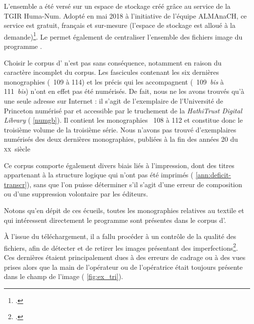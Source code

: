 L'ensemble a été versé sur un espace de stockage créé grâce au service \sharedocs{} de la TGIR Huma-Num. Adopté en mai 2018 à l'initiative de l'équipe ALMAnaCH, ce service est gratuit, français et sur-mesure (l'espace de stockage est alloué à la demande)\footcite[p. 33-34]{chague2}. Le \sharedocs{} permet également de centraliser l'ensemble des fichiers image du programme \timeus.

Choisir le corpus d'\ia{} n'est pas sans conséquence, notamment en raison du caractère incomplet du corpus. Les fascicules contenant les six dernières monographies (\no{}~109 à 114) et les précis qui les accompagnent (\no{}~109~\textit{bis} à 111~\textit{bis}) n'ont en effet pas été numérisés. De fait, nous ne les avons trouvés qu'à une seule adresse sur Internet : il s'agit de l'exemplaire de l'Université de Princeton numérisé par \gb{} et accessible par le truchement de la \textit{HathiTrust Digital Library} (\ann{} \ref{numgb}). Il contient les monographies \no{}~108 à 112 et constitue donc le troisième volume de la troisième série. Nous n'avons pas trouvé d'exemplaires numérisés des deux dernières monographies, publiées à la fin des années 20 du \textsc{xx}\ieme~siècle

Ce corpus comporte également divers biais liés à l'impression, dont des titres appartenant à la structure logique qui n'ont pas été imprimés (\ann{} \ref{ann:deficit-transcr}), sans que l'on puisse déterminer s'il s'agit d'une erreur de composition ou d'une suppression volontaire par les éditeurs. 

Notons qu'en dépit de ces écueils, toutes les monographies relatives au textile et qui intéressent directement le programme \timeus{} sont présentes dans le corpus d'\ia.

À l'issue du téléchargement, il a fallu procéder à un contrôle de la qualité des fichiers, afin de détecter et de retirer les images présentant des imperfections\footcite{chague2}. Ces dernières étaient principalement dues à des erreurs de cadrage ou à des vues prises alors que la main de l'opérateur ou de l'opératrice était toujours présente dans le champ de l'image (\fig{} \ref{fig:ex_tri}).

